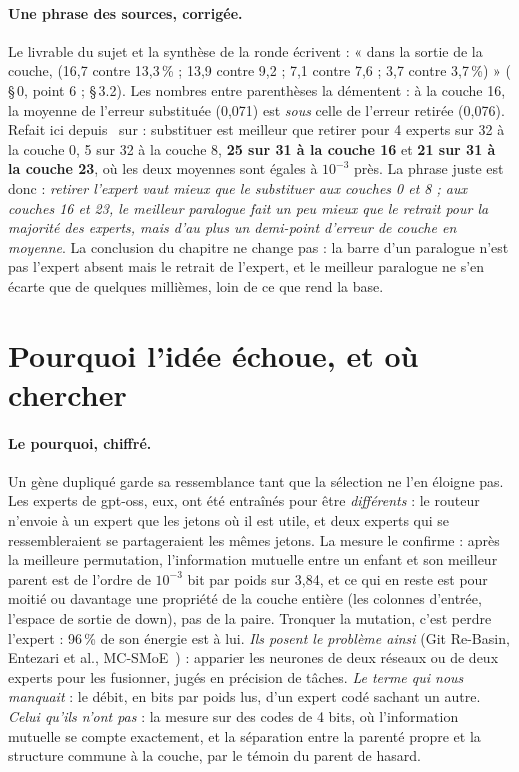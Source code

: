 \paragraph{Une phrase des sources, corrigée.} Le livrable du sujet et la synthèse de la ronde écrivent : « dans la sortie de la couche,  (16,7 contre 13,3\,\% ; 13,9 contre 9,2 ; 7,1 contre 7,6 ; 3,7 contre 3,7\,\%) » ( §\,0, point 6 ;  §\,3.2). Les nombres entre parenthèses la démentent : à la couche 16, la moyenne de l'erreur substituée (0,071) est \emph{sous} celle de l'erreur retirée (0,076). Refait ici depuis  \calc~sur \mes : substituer est meilleur que retirer pour 4 experts sur 32 à la couche 0, 5 sur 32 à la couche 8, \textbf{25 sur 31 à la couche 16} et \textbf{21 sur 31 à la couche 23}, où les deux moyennes sont égales à $10^{-3}$ près. La phrase juste est donc : \emph{retirer l'expert vaut mieux que le substituer aux couches 0 et 8 ; aux couches 16 et 23, le meilleur paralogue fait un peu mieux que le retrait pour la majorité des experts, mais d'au plus un demi-point d'erreur de couche en moyenne}. La conclusion du chapitre ne change pas : la barre d'un paralogue n'est pas l'expert absent mais le retrait de l'expert, et le meilleur paralogue ne s'en écarte que de quelques millièmes, loin de ce que rend la base.

\section{Pourquoi l'idée échoue, et où chercher}\label{t3dup:sec:pourquoi}

\paragraph{Le pourquoi, chiffré.} Un gène dupliqué garde sa ressemblance tant que la sélection ne l'en éloigne pas. Les experts de gpt-oss, eux, ont été entraînés pour être \emph{différents} : le routeur n'envoie à un expert que les jetons où il est utile, et deux experts qui se ressembleraient se partageraient les mêmes jetons. La mesure le confirme : après la meilleure permutation, l'information mutuelle entre un enfant et son meilleur parent est de l'ordre de $10^{-3}$ bit par poids sur 3,84, et ce qui en reste est pour moitié ou davantage une propriété de la couche entière (les colonnes d'entrée, l'espace de sortie de down), pas de la paire. Tronquer la mutation, c'est perdre l'expert : 96\,\% de son énergie est à lui. \emph{Ils posent le problème ainsi} (Git Re-Basin, Entezari et al., MC-SMoE~\cite{li2023mcsmoe}) : apparier les neurones de deux réseaux ou de deux experts pour les fusionner, jugés en précision de tâches. \emph{Le terme qui nous manquait} : le débit, en bits par poids lus, d'un expert codé sachant un autre. \emph{Celui qu'ils n'ont pas} : la mesure sur des codes de 4 bits, où l'information mutuelle se compte exactement, et la séparation entre la parenté propre et la structure commune à la couche, par le témoin du parent de hasard.

